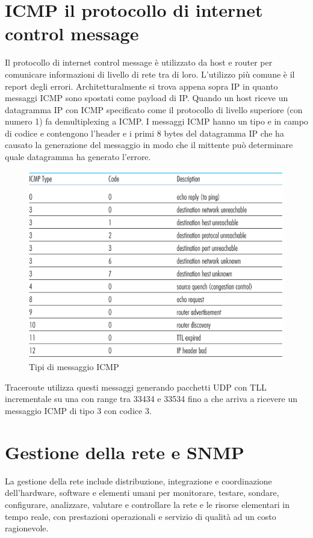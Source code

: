 \section{ICMP il protocollo di internet control message}
Il protocollo di internet control message \`e utilizzato da host e router per comunicare informazioni di livello di rete tra di loro. L'utilizzo pi\`u comune \`e il report degli errori.  Architetturalmente si trova appena
sopra IP in quanto messaggi ICMP sono spostati come payload di IP. Quando un host riceve un datagramma IP con ICMP specificato come il protocollo di livello superiore (con numero 1) fa demultiplexing a 
ICMP. I messaggi ICMP hanno un tipo e in campo di codice e contengono l'header e i primi 8 bytes del datagramma IP che ha causato la generazione del messaggio in modo che il mittente pu\`o determinare
quale datagramma ha generato l'errore.  
\begin{figure}[h]
\includegraphics[width=\textwidth]{ICMPValues.png}
\caption{Tipi di messaggio ICMP}
\end{figure}
Traceroute utilizza questi messaggi generando pacchetti UDP con TLL incrementale su una con range tra 33434 e 33534 fino a che arriva a ricevere un messaggio ICMP di tipo 3 con codice 3.
\section{Gestione della rete e SNMP}
La gestione della rete include distribuzione, integrazione e coordinazione dell'hardware, software e elementi umani per monitorare, testare, sondare, configurare, analizzare, valutare e controllare la rete e le
risorse elementari in tempo reale, con prestazioni operazionali e servizio di qualit\`a ad un costo ragionevole. 
